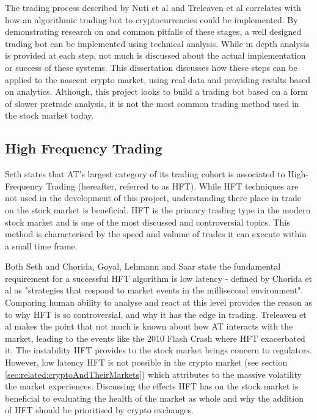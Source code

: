 The trading process described by Nuti et al \cite{ART:Nuti:2011} and Treleaven et al \cite{ART:Treleaven:2013} correlates with how an algorithmic trading bot to cryptocurrencies could be implemented. By demonstrating research on and common pitfalls of these stages, a well designed trading bot can be implemented using technical analysis. While in depth analysis is provided at each step, not much is discussed about the actual implementation or success of these systems. This dissertation discusses how these steps can be applied to the nascent crypto market, using real data and providing results based on analytics. Although, this project looks to build a trading bot based on a form of slower pretrade analysis, it is not the most common trading method used in the stock market today. 

\subsection{High Frequency Trading}
\label{sec:related:algoTrading:HFT}
\noindent  Seth \cite{WEB:SETH:0001} states that AT's largest category of its trading cohort is associated to High-Frequency Trading (hereafter, referred to as HFT). While HFT techniques are not used in the development of this project, understanding there place in trade on the stock market is beneficial. HFT is the primary trading type in the modern stock market and is one of the most discussed and controversial topics. This method is characterised by the speed and volume of trades it can execute within a small time frame.

Both Seth \cite{WEB:SETH:0001} and Chorida, Goyal, Lehmann and Saar \cite{REPORT:ChordiaEtAl:2013} state the fundamental requirement for a successful HFT algorithm is low latency - defined by Chorida et al as "strategies that respond to market events in the millisecond environment". Comparing human ability to analyse and react at this level provides the reason as to why HFT is so controversial, and why it has the edge in trading. Treleaven et al \cite{ART:Treleaven:2013} makes the point that not much is known about how AT interacts with the market, leading to the events like the 2010 Flash Crash where HFT exacerbated it. The instability HFT provides to the stock market brings concern to regulators. However, low latency HFT is not possible in the crypto market (see section \ref{sec:related:cryptoAndTheirMarkets}) which attributes to the massive volatility the market experiences. Discussing the effects HFT has on the stock market is beneficial to evaluating the health of the market as whole and why the addition of HFT should be prioritised by crypto exchanges.

